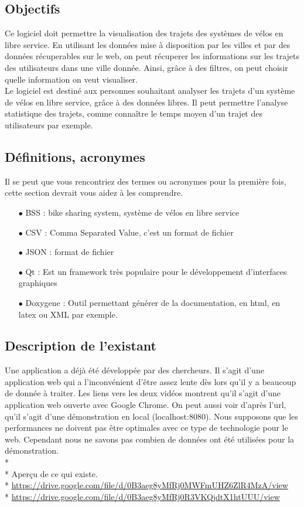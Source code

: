 \documentclass[12pt]{article}
\begin{document}
		\subsection{Objectifs}
			Ce logiciel doit permettre la visualisation des trajets des systèmes de vélos en libre service. En utilisant les données mise à disposition par les villes et par des données récuperables sur le web, on peut récuperer les informations sur les trajets des utilisateurs dans une ville donnée. Ainsi, grâce à des filtres, on peut choisir quelle information on veut visualiser.\\
			Le logiciel est destiné aux personnes souhaitant analyser les trajets d'un système de vélos en libre service, grâce à des données libres. Il peut permettre l'analyse statistique des trajets, comme connaître le temps moyen d'un trajet des utilisateurs par exemple.

		\subsection{Définitions, acronymes}
			Il se peut que vous rencontriez des termes ou acronymes pour la première fois, cette section devrait vous aidez à les comprendre.
			\begin{itemize}
				\item[$\bullet$] BSS : bike sharing system, système de vélos en libre service
				\item[$\bullet$] CSV : Comma Separated Value, c'est un format de fichier
				\item[$\bullet$] JSON : format de fichier
				\item[$\bullet$] Qt : Est un framework très populaire pour le développement d'interfaces graphiques
				\item[$\bullet$] Doxygene : Outil permettant générer de la documentation, en html, en latex ou XML par exemple.
			\end{itemize}

		\subsection{Description de l'existant}
			Une application a déjà été développée par des chercheurs. Il s’agit d’une application web qui a l’inconvénient d’être assez lente dès lors qu’il y a beaucoup de donnée à traiter. Les liens vers les deux vidéos montrent qu'il s'agit d'une application web ouverte avec Google Chrome. On peut aussi voir d'après l'url, qu'il s'agit d'une démonstration en local (localhost:8080). Nous supposons que les performances ne doivent pas être optimales avec ce type de technologie pour le web. Cependant nous ne savons pas combien de données ont été utilisées pour la démonstration.\\*\\*
			Aperçu de ce qui existe.\\*
			\url{https://drive.google.com/file/d/0B3aeg8yMfRj0MWFmUHZ6ZlR4MzA/view}\\*
			\url{https://drive.google.com/file/d/0B3aeg8yMfRj0R3VKQjdtX1htUUU/view}
		
\end{document}
